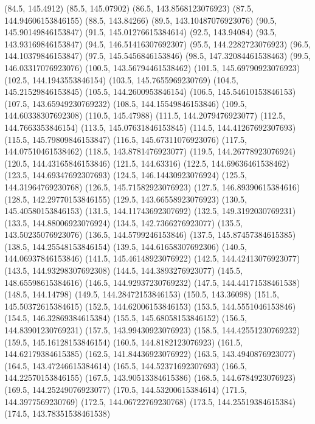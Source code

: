 {{{		(84.5, 145.4912)
		(85.5, 145.07902)
		(86.5, 143.8568123076923)
		(87.5, 144.94606153846155)
		(88.5, 143.84266)
		(89.5, 143.10487076923076)
		(90.5, 145.90149846153847)
		(91.5, 145.01276615384614)
		(92.5, 143.94084)
		(93.5, 143.93169846153847)
		(94.5, 146.51416307692307)
		(95.5, 144.2282723076923)
		(96.5, 144.10379846153847)
		(97.5, 145.5456846153846)
		(98.5, 147.32084461538463)
		(99.5, 146.03317076923076)
		(100.5, 143.56794461538462)
		(101.5, 145.69790923076923)
		(102.5, 144.1943553846154)
		(103.5, 145.7655969230769)
		(104.5, 145.21529846153845)
		(105.5, 144.2600953846154)
		(106.5, 145.54610153846153)
		(107.5, 143.65949230769232)
		(108.5, 144.15549846153846)
		(109.5, 144.60338307692308)
		(110.5, 145.47988)
		(111.5, 144.2079476923077)
		(112.5, 144.7663353846154)
		(113.5, 145.07631846153845)
		(114.5, 144.41267692307693)
		(115.5, 145.79809846153847)
		(116.5, 145.67311076923076)
		(117.5, 144.07510461538462)
		(118.5, 143.8781476923077)
		(119.5, 144.26778923076924)
		(120.5, 144.43165846153846)
		(121.5, 144.63316)
		(122.5, 144.69636461538462)
		(123.5, 144.69347692307693)
		(124.5, 146.14430923076924)
		(125.5, 144.31964769230768)
		(126.5, 145.71582923076923)
		(127.5, 146.89390615384616)
		(128.5, 142.29770153846155)
		(129.5, 143.66558923076923)
		(130.5, 145.40580153846153)
		(131.5, 144.11743692307692)
		(132.5, 149.3192030769231)
		(133.5, 144.88006923076924)
		(134.5, 142.7366276923077)
		(135.5, 143.50235076923076)
		(136.5, 144.5799246153846)
		(137.5, 145.87457384615385)
		(138.5, 144.25548153846154)
		(139.5, 144.61658307692306)
		(140.5, 144.06937846153846)
		(141.5, 145.46148923076922)
		(142.5, 144.42413076923077)
		(143.5, 144.93298307692308)
		(144.5, 144.3893276923077)
		(145.5, 148.65598615384616)
		(146.5, 144.92937230769232)
		(147.5, 144.44171538461538)
		(148.5, 144.14798)
		(149.5, 144.28472153846153)
		(150.5, 143.36098)
		(151.5, 145.50372615384615)
		(152.5, 144.62006153846153)
		(153.5, 144.5551046153846)
		(154.5, 146.32869384615384)
		(155.5, 145.68058153846152)
		(156.5, 144.83901230769231)
		(157.5, 143.99430923076923)
		(158.5, 144.42551230769232)
		(159.5, 145.16128153846154)
		(160.5, 144.8182123076923)
		(161.5, 144.62179384615385)
		(162.5, 141.84436923076922)
		(163.5, 143.4940876923077)
		(164.5, 143.47246615384614)
		(165.5, 144.52371692307693)
		(166.5, 144.22570153846155)
		(167.5, 143.90513384615386)
		(168.5, 144.6784923076923)
		(169.5, 144.25249076923077)
		(170.5, 144.53200615384614)
		(171.5, 144.3977569230769)
		(172.5, 144.06722769230768)
		(173.5, 144.25519384615384)
		(174.5, 143.78351538461538)
}}}
